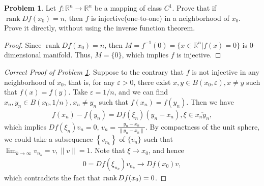\documentclass[11pt]{article}
\theoremstyle{definition}
\newtheorem{problem}{Problem}
\theoremstyle{definition}
\begin{document}
\medskip

\begin{problem}\label{problem_55}
Let $f:\mathbb{R}^n\to\mathbb{R}^n$ be a mapping of class $C^1$. Prove that if $\operatorname{rank} Df(x_0)=n$, then $f$ is injective(one-to-one) in a neighborhood of $x_0$. Prove it directly, without using the inverse function theorem.
\end{problem}
\begin{proof}
Since $\operatorname{rank} Df(x_0) = n$, then $M = f^{-1}(0) = \{x \in \mathbb{R}^n | f(x) = 0\}$ is $0$-dimensional manifold. Thus, $M = \{0\}$, which implies $f$ is injective.
\end{proof}

\medskip

\begin{proof}[Correct Proof of Problem \ref{problem_55}]
Suppose to the contrary that $f$ is not injective in any neighborhood of $x_0$, that is, for any $\varepsilon > 0$, there exist $x, y \in B(x_0, \varepsilon), x\neq y$ such that $f(x) = f(y)$. Take $\varepsilon = 1/n$, and we can find $x_n, y_n \in B(x_0, 1/n), x_n \neq y_n$ such that $f(x_n) = f(y_n)$. Then we have
\begin{align*}
    f(x_n) - f(y_n) = Df(\xi_n) (y_n - x_n), \xi \in \overline{x_ny_n},
\end{align*}
which implies $Df(\xi_n)v_n = 0$, $v_n = \frac{y_n - x_n}{\|y_n - x_n\|}$. By compactness of the unit sphere, we could take a subsequence $\left\{v_{n_k} \right\}$ of $\{v_n\}$ such that $\lim_{k\to\infty} v_{n_k} = v, \|v\| = 1$. Note that $\xi \to x_0$, and hence
\begin{align*}
    0 = Df(\xi_{n_k}) v_{n_k} \to Df(x_0)v,
\end{align*}
which contradicts the fact that $\rank Df(x_0) = 0$.
\end{proof}

\medskip
\end{document}
